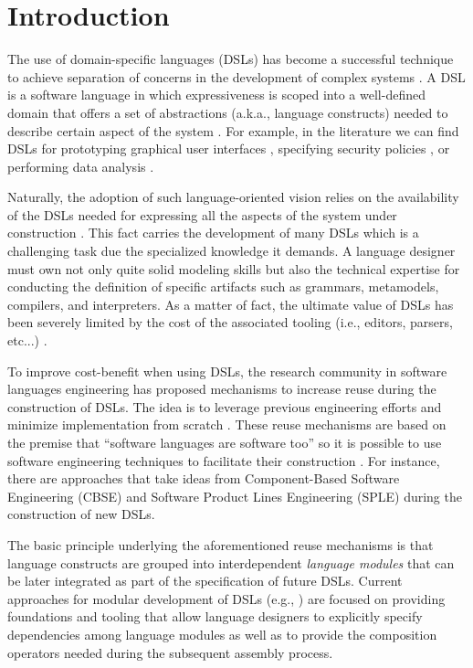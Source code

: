 \section{Introduction}
\label{sec:introduction}

The use of domain-specific languages (DSLs) has become a successful technique to achieve separation of concerns in the development of complex systems \cite{Cook:2006}. A DSL is a software language in which expressiveness is scoped into a well-defined domain that offers a set of abstractions (a.k.a., language constructs) needed to describe certain aspect of the system \cite{Combemale:2014}. For example, in the literature we can find DSLs for prototyping graphical user interfaces \cite{Oney:2012}, specifying security policies \cite{Lodderstedt:2002}, or performing data analysis \cite{Eberius:2012}.
 
\vspace{3mm}
Naturally, the adoption of such language-oriented vision relies on the availability of the DSLs needed for expressing all the aspects of the system under construction \cite{Clark:2013}. This fact carries the development of many DSLs which is a challenging task due the specialized knowledge it demands. A language designer must own not only quite solid modeling skills but also the technical expertise for conducting the definition of specific artifacts such as grammars, metamodels, compilers, and interpreters. As a matter of fact, the ultimate value of DSLs has been severely limited by the cost of the associated tooling (i.e., editors, parsers, etc...) \cite{jezequel:2014}.

To improve cost-benefit when using DSLs, the research community in software languages engineering has proposed mechanisms to increase reuse during the construction of DSLs. The idea is to leverage previous engineering efforts and minimize implementation from scratch \cite{Storm:2013}. These reuse mechanisms are based on the premise that ``software languages are software too'' \cite{Favre:2011} so it is possible to use software engineering techniques to facilitate their construction \cite{Kleppe:2009}. For instance, there are approaches that take ideas from Component-Based Software Engineering (CBSE) \cite{Cleenewerck:2003} and Software Product Lines Engineering (SPLE) \cite{Zschaler:2010} during the construction of new DSLs.

The basic principle underlying the aforementioned reuse mechanisms is that language constructs are grouped into interdependent \textit{language modules} that can be later integrated as part of the specification of future DSLs. Current approaches for modular development of DSLs (e.g., \cite{Vacchi:2015,Mernik:2013,Rumpe:2010}) are focused on providing foundations and tooling that allow language designers to explicitly specify dependencies among language modules as well as to provide the composition operators needed during the subsequent assembly process.

